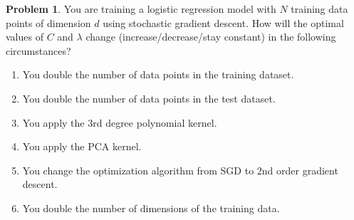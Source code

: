 \documentclass[10pt]{exam}
\theoremstyle{definition}
\newtheorem{problem}{Problem}
\begin{document}
\newpage
\begin{problem}
    You are training a logistic regression model with $N$ training data points of dimension $d$ using stochastic gradient descent.
    How will the optimal values of $C$ and $\lambda$ change (increase/decrease/stay constant) in the following circumstances?
    \begin{enumerate}
        \item
        You double the number of data points in the training dataset.
            \vspace{3in}

        \item
        You double the number of data points in the test dataset.
            \vspace{3in}

        \item
        You apply the 3rd degree polynomial kernel.
            \vspace{3in}

        \item
        You apply the PCA kernel.
            \vspace{3in}

%

        \item
        You change the optimization algorithm from SGD to 2nd order gradient descent.
            \vspace{3in}

        \item
        You double the number of dimensions of the training data.
            \vspace{3in}
    \end{enumerate}
\end{problem}
\end{document}
